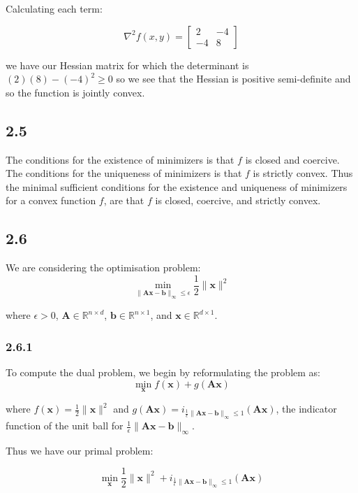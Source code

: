 \documentclass[12pt]{article}
\begin{document}
Calculating each term:

\[\nabla^2 f(x, y) = \begin{bmatrix}
                 2 & -4\\
                 -4 & 8
         \end{bmatrix}
\]

we have our Hessian matrix for which the determinant is $(2)(8) - (-4)^2 \geq 0$ so we see that the Hessian is positive semi-definite and so the function is jointly convex.

\subsection*{2.5}
  The conditions for the existence of minimizers is that $f$ is closed and coercive.
  The conditions for the uniqueness of minimizers is that $f$ is strictly convex.
Thus the minimal sufficient conditions for the existence and uniqueness of minimizers for a convex function $f$, are that $f$ is closed, coercive, and strictly convex.

\subsection*{2.6}

We are considering the optimisation problem:
\[\min_{\|\textbf{A}\textbf{x} - \textbf{b}\|_{\infty} \leq \epsilon} \frac{1}{2}\|\textbf{x}\|^2\]

where $\epsilon > 0$, $\textbf{A} \in \mathbb{R}^{n\times d}$, $\textbf{b} \in \mathbb{R}^{n \times 1}$, and $\textbf{x} \in \mathbb{R}^{d \times 1}$.

\subsubsection*{2.6.1}

To compute the dual problem, we begin by reformulating the problem as:
\[\min_{\textbf{x}}  f(\textbf{x}) + g(\textbf{Ax})\]

where $f(\textbf{x}) = \frac{1}{2}\|\textbf{x}\|^2$ and $g(\textbf{Ax}) =  i_{\frac{1}{\epsilon}\|\textbf{A}\textbf{x} - \textbf{b}\|_{\infty} \leq 1}\left(\textbf{Ax}\right)$, the indicator function of the unit ball for $\frac{1}{\epsilon}\|\textbf{A}\textbf{x} - \textbf{b}\|_{\infty}$.

Thus we have our primal problem:

\[\min_{\textbf{x}}  \frac{1}{2}\|\textbf{x}\|^2 + i_{\frac{1}{\epsilon}\|\textbf{A}\textbf{x} - \textbf{b}\|_{\infty} \leq 1}\left(\textbf{Ax}\right)\]
\end{document}
